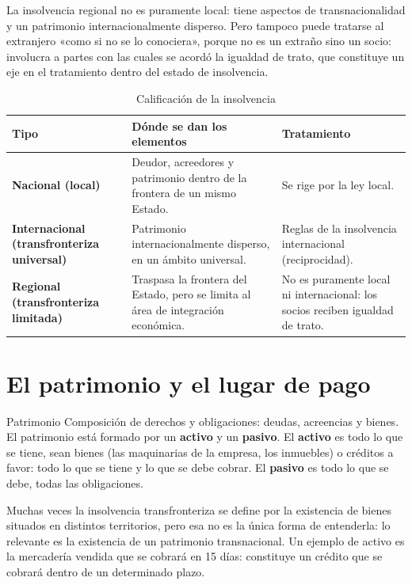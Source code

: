 \documentclass[12pt,oneside]{book}
\begin{document}
La insolvencia regional no es puramente local: tiene aspectos de transnacionalidad y un patrimonio internacionalmente disperso. Pero tampoco puede tratarse al extranjero «como si no se lo conociera», porque no es un extraño sino un socio: involucra a partes con las cuales se acordó la igualdad de trato, que constituye un eje en el tratamiento dentro del estado de insolvencia.

\begin{table}[H]
\centering
\caption{Calificación de la insolvencia}
\begin{tabularx}{\textwidth}{>{\raggedright\arraybackslash}p{} >{\raggedright\arraybackslash}X >{\raggedright\arraybackslash}X}
\toprule
\textbf{Tipo} & \textbf{Dónde se dan los elementos} & \textbf{Tratamiento} \\
\midrule
\textbf{Nacional (local)} & Deudor, acreedores y patrimonio dentro de la frontera de un mismo Estado. & Se rige por la ley local. \\
\textbf{Internacional (transfronteriza universal)} & Patrimonio internacionalmente disperso, en un ámbito universal. & Reglas de la insolvencia internacional (reciprocidad). \\
\textbf{Regional (transfronteriza limitada)} & Traspasa la frontera del Estado, pero se limita al área de integración económica. & No es puramente local ni internacional: los socios reciben igualdad de trato. \\
\bottomrule
\end{tabularx}
\end{table}

\section{El patrimonio y el lugar de pago}

\begin{definition}{Patrimonio}
Composición de derechos y obligaciones: deudas, acreencias y bienes. El patrimonio está formado por un \textbf{activo} y un \textbf{pasivo}. El \textbf{activo} es todo lo que se tiene, sean bienes (las maquinarias de la empresa, los inmuebles) o créditos a favor: todo lo que se tiene y lo que se debe cobrar. El \textbf{pasivo} es todo lo que se debe, todas las obligaciones.
\end{definition}

Muchas veces la insolvencia transfronteriza se define por la existencia de bienes situados en distintos territorios, pero esa no es la única forma de entenderla: lo relevante es la existencia de un patrimonio transnacional. Un ejemplo de activo es la mercadería vendida que se cobrará en 15 días: constituye un crédito que se cobrará dentro de un determinado plazo.
\end{document}
